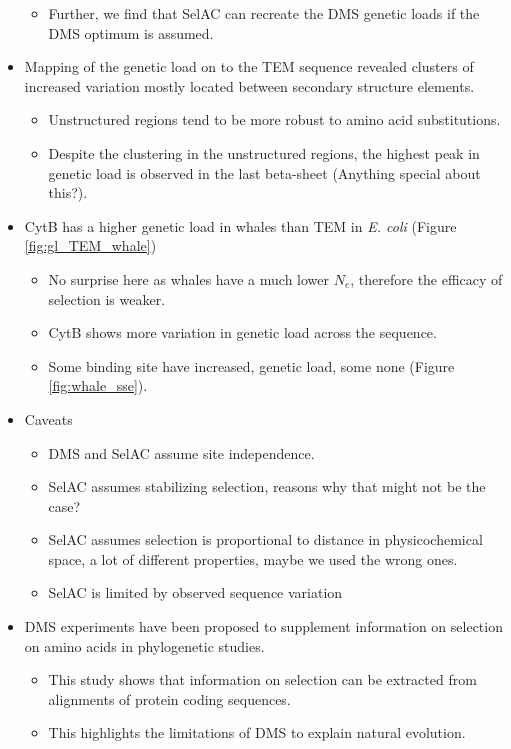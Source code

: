 \documentclass[12pt]{article}
\begin{document}
\begin{itemize}
\begin{itemize}
		\item Further, we find that SelAC can recreate the DMS genetic loads if the DMS optimum is assumed.
	\end{itemize}
	\item Mapping of the genetic load on to the TEM sequence revealed clusters of increased variation mostly located between secondary structure elements. 	
	\begin{itemize}
		\item Unstructured regions tend to be more robust to amino acid substitutions.
		\item Despite the clustering in the unstructured regions, the highest peak in genetic load is observed in the last beta-sheet (Anything special about this?).
	\end{itemize}
	
	\item CytB has a higher genetic load in whales than TEM in \textit{E. coli} (Figure \ref{fig:gl_TEM_whale})
	\begin{itemize}
		\item No surprise here as whales have a much lower $N_e$, therefore the efficacy of selection is weaker.
		\item CytB shows more variation in genetic load across the sequence.
		\item Some binding site have increased, genetic load, some none (Figure \ref{fig:whale_sse}).
	\end{itemize}
	\item Caveats
	\begin{itemize}
		\item DMS and SelAC assume site independence.
		\item SelAC assumes stabilizing selection, reasons why that might not be the case?
		\item SelAC assumes selection is proportional to distance in physicochemical space, a lot of different properties, maybe we used the wrong ones.
		\item SelAC is limited by observed sequence variation
	\end{itemize}
	\item DMS experiments have been proposed to supplement information on selection on amino acids in phylogenetic studies.
	\begin{itemize}
		\item This study shows that information on selection can be extracted from alignments of protein coding sequences.
		\item This highlights the limitations of DMS to explain natural evolution.
	\end{itemize}
\end{itemize}
\end{document}
